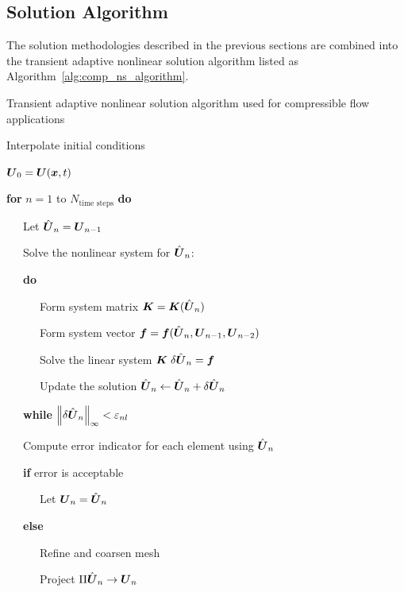 \subsection{Solution Algorithm}
The solution methodologies described in the previous sections are combined into the transient adaptive nonlinear solution algorithm listed as Algorithm~\ref{alg:comp_ns_algorithm}.
\begin{algorithm}[!htb]
  \centering
  \begin{minipage}{.95\textwidth}
    \caption{Transient adaptive nonlinear solution algorithm used for compressible flow applications\label{alg:comp_ns_algorithm}}
    \noindent
    \sffamily
    \setcounter{alines}{0}
    \begin{list}{:\ \ }{}
        \renewcommand{\baselinestretch}{1.0} \setlength{\itemsep}{-1ex}
        \item Interpolate initial conditions
	\item $\bv{U}_0 = \bv{U}(\bv{x},t)$ 
        \item \textbf{for} $n=1$ to $N_\text{time steps}$ \textbf{do}
	\item \ \ \ Let $\hat{\bv{U}}_n = \bv{U}_{n-1}$
	\item \ \ \ Solve the nonlinear system for $\hat{\bv{U}}_n$:
 	\item \ \ \ \textbf{do}
 	\item \ \ \ \ \ \ Form system matrix $\bt{K} = \bt{K}(\hat{\bv{U}}_n)$
 	\item \ \ \ \ \ \ Form system vector $\bv{f}= \bv{f}(\hat{\bv{U}}_n,\bv{U}_{n-1},\bv{U}_{n-2})$
 	\item \ \ \ \ \ \ Solve the linear system $\bt{K} \; \delta\hat{\bv{U}}_n = \bv{f}$
	\item \ \ \ \ \ \ Update the solution $\hat{\bv{U}}_n \leftarrow \hat{\bv{U}}_n + \delta\hat{\bv{U}}_n$
 	\item \ \ \ \textbf{while} $\norm[\infty]{\delta\hat{\bv{U}}_n} < \varepsilon_{nl}$
	\item \ \ \ Compute error indicator for each element using $\hat{\bv{U}}_n$
	\item \ \ \ \textbf{if} error is acceptable
	\item \ \ \ \ \ \ Let $\bv{U}_n=\hat{\bv{U}}_n$
        \item \ \ \ \textbf{else}
	\item \ \ \ \ \ \ Refine and coarsen mesh
	\item \ \ \ \ \ \ Project $\Pi\hat{\bv{U}}_n\rightarrow\bv{U}_n$

\end{list}
\end{minipage}
\end{algorithm}
